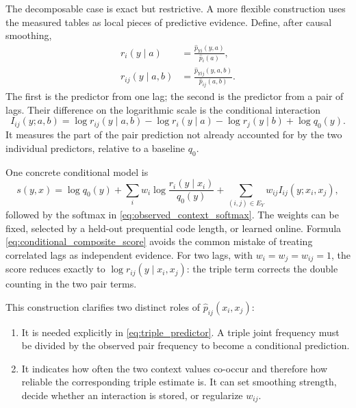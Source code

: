 \documentclass[11pt]{article}
\newcommand{\1}{\mathbf 1}
\newcommand{\hatp}{\widehat p}
\begin{document}
The decomposable case is exact but restrictive.  A more flexible construction
uses the measured tables as local pieces of predictive evidence.  Define,
after causal smoothing,
\begin{align}
  r_i(y\mid a)
  &=
  \frac{\hatp_{Yi}(y,a)}{\hatp_i(a)}, \label{eq:pair_predictor}\\
  r_{ij}(y\mid a,b)
  &=
  \frac{\hatp_{Yij}(y,a,b)}{\hatp_{ij}(a,b)}.
  \label{eq:triple_predictor}
\end{align}
The first is the predictor from one lag; the second is the predictor from a
pair of lags.  Their difference on the logarithmic scale is the conditional
interaction
\begin{equation}
  I_{ij}(y;a,b)
  =
  \log r_{ij}(y\mid a,b)
  -\log r_i(y\mid a)
  -\log r_j(y\mid b)
  +\log q_0(y).
  \label{eq:conditional_interaction}
\end{equation}
It measures the part of the pair prediction not already accounted for by the
two individual predictors, relative to a baseline \(q_0\).

One concrete conditional model is
\begin{equation}
  s(y,x)
  =
  \log q_0(y)
  +\sum_i w_i\log\frac{r_i(y\mid x_i)}{q_0(y)}
  +\sum_{(i,j)\in E_Y}w_{ij}I_{ij}(y;x_i,x_j),
  \label{eq:conditional_composite_score}
\end{equation}
followed by the softmax in \eqref{eq:observed_context_softmax}.  The weights
can be fixed, selected by a held-out prequential code length, or learned
online.  Formula \eqref{eq:conditional_composite_score} avoids the common
mistake of treating correlated lags as independent evidence.  For two lags,
with \(w_i=w_j=w_{ij}=1\), the score reduces exactly to
\(\log r_{ij}(y\mid x_i,x_j)\): the triple term corrects the double counting
in the two pair terms.

This construction clarifies two distinct roles of
\(\hatp_{ij}(x_i,x_j)\):
\begin{enumerate}
  \item It is needed explicitly in \eqref{eq:triple_predictor}.  A triple
  joint frequency must be divided by the observed pair frequency to become a
  conditional prediction.
  \item It indicates how often the two context values co-occur and therefore
  how reliable the corresponding triple estimate is.  It can set smoothing
  strength, decide whether an interaction is stored, or regularize
  \(w_{ij}\).
\end{enumerate}
\end{document}
